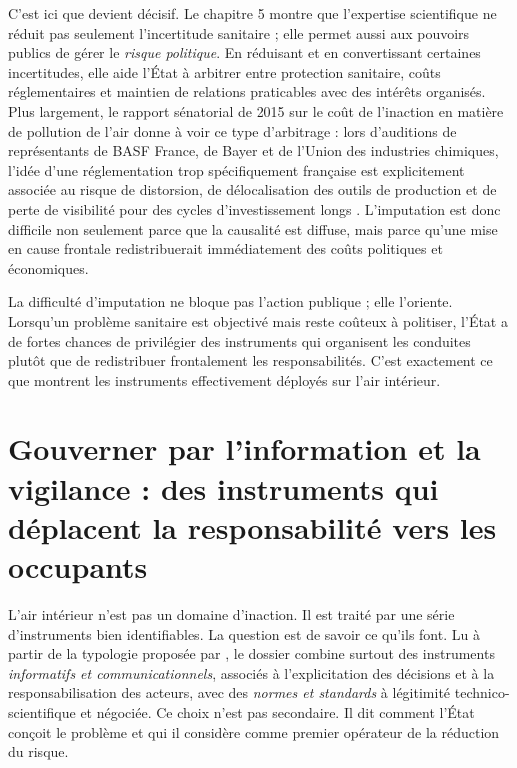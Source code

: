 \documentclass[a4paper,12pt,twoside]{book}
\begin{document}
C'est ici que \textcite{Borraz2008PolitiquesRisque} devient décisif. Le chapitre 5 montre que l'expertise scientifique ne réduit pas seulement l'incertitude sanitaire ; elle permet aussi aux pouvoirs publics de gérer le \emph{risque politique}. En réduisant et en convertissant certaines incertitudes, elle aide l'État à arbitrer entre protection sanitaire, coûts réglementaires et maintien de relations praticables avec des intérêts organisés. Plus largement, le rapport sénatorial de 2015 sur le coût de l'inaction en matière de pollution de l'air donne à voir ce type d'arbitrage : lors d'auditions de représentants de BASF France, de Bayer et de l'Union des industries chimiques, l'idée d'une réglementation trop spécifiquement française est explicitement associée au risque de distorsion, de délocalisation des outils de production et de perte de visibilité pour des cycles d'investissement longs \parencite{Senat2015CoutInaction}. L'imputation est donc difficile non seulement parce que la causalité est diffuse, mais parce qu'une mise en cause frontale redistribuerait immédiatement des coûts politiques et économiques.

La difficulté d'imputation ne bloque pas l'action publique ; elle l'oriente. Lorsqu'un problème sanitaire est objectivé mais reste coûteux à politiser, l'État a de fortes chances de privilégier des instruments qui organisent les conduites plutôt que de redistribuer frontalement les responsabilités. C'est exactement ce que montrent les instruments effectivement déployés sur l'air intérieur.

\chapter{Gouverner par l'information et la vigilance : des instruments qui déplacent la responsabilité vers les occupants}

L'air intérieur n'est pas un domaine d'inaction. Il est traité par une série d'instruments bien identifiables. La question est de savoir ce qu'ils font. Lu à partir de la typologie proposée par \textcite{lascoumesConclusionLinnovationInstrumentale2005}, le dossier combine surtout des instruments \emph{informatifs et communicationnels}, associés à l'explicitation des décisions et à la responsabilisation des acteurs, avec des \emph{normes et standards} à légitimité technico-scientifique et négociée. Ce choix n'est pas secondaire. Il dit comment l'État conçoit le problème et qui il considère comme premier opérateur de la réduction du risque.
\end{document}
